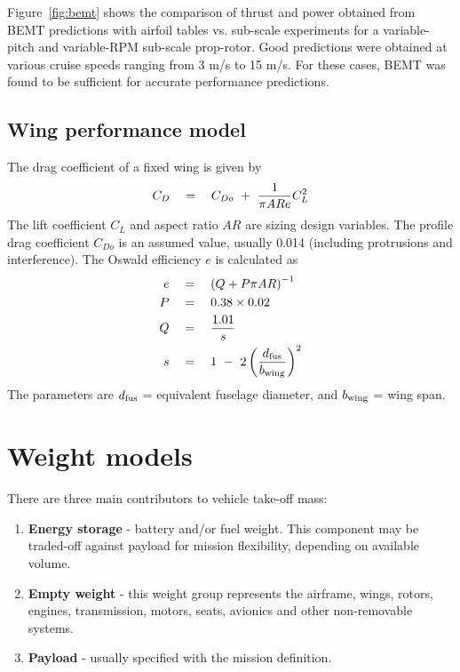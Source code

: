 Figure~\ref{fig:bemt} shows the comparison of thrust and power obtained from BEMT predictions with airfoil tables vs. sub-scale experiments for a variable-pitch and variable-RPM sub-scale prop-rotor. Good predictions were obtained at various cruise speeds ranging from 3 m/s to 15 m/s. For these cases, BEMT was found to be sufficient for accurate performance predictions. %

\subsection{Wing performance model}
The drag coefficient of a fixed wing is given by 
\begin{equation}
C_D \quad = \quad C_{Do} \textrm{ } + \textrm{ } \frac{1}{\pi AR e} C_L^2 
\end{equation}
The lift coefficient $C_L$ and aspect ratio $AR$ are sizing design variables. The profile drag coefficient $C_{Do}$ is an assumed value, usually 0.014 (including protrusions and interference). The Oswald efficiency $e$ is calculated as %
\begin{align*}
e \quad &= \quad \left(Q + P \pi AR \right)^{-1}  \\
P \quad &= \quad 0.38 \times 0.02 \\
Q \quad &= \quad \frac{1.01}{s} \\ 
s \quad &= \quad 1 \textrm{ } - \textrm{ } 2 \left(\frac{d_{\rm fus}}{b_{\rm wing}}\right)^2
\end{align*}
The parameters are $d_{\rm fus}$ = equivalent fuselage diameter, and $b_{\rm wing}$ = wing span.
\pagebreak
\section{Weight models}
There are three main contributors to vehicle take-off mass:
\begin{enumerate}
\item {\bf Energy storage} - battery and/or fuel weight. This component may be traded-off against payload for mission flexibility, depending on available volume. 
\item {\bf Empty weight} - this weight group represents the airframe, wings, rotors, engines, transmission, motors, seats, avionics and other non-removable systems.
\item {\bf Payload} - usually specified with the mission definition.
\end{enumerate}

